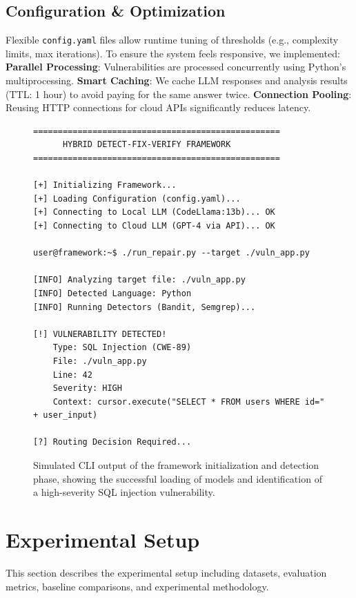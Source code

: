 \documentclass[conference]{IEEEtran}
\begin{document}
\subsection{Configuration \& Optimization}
Flexible \texttt{config.yaml} files allow runtime tuning of thresholds (e.g., complexity limits, max iterations). To ensure the system feels responsive, we implemented:
\textbf{Parallel Processing}: Vulnerabilities are processed concurrently using Python's multiprocessing.
\textbf{Smart Caching}: We cache LLM responses and analysis results (TTL: 1 hour) to avoid paying for the same answer twice.
\textbf{Connection Pooling}: Reusing HTTP connections for cloud APIs significantly reduces latency.
\begin{figure}[t]
\centering
\begin{small}
\begin{verbatim}
==================================================
      HYBRID DETECT-FIX-VERIFY FRAMEWORK
==================================================

[+] Initializing Framework...
[+] Loading Configuration (config.yaml)...
[+] Connecting to Local LLM (CodeLlama:13b)... OK
[+] Connecting to Cloud LLM (GPT-4 via API)... OK

user@framework:~$ ./run_repair.py --target ./vuln_app.py

[INFO] Analyzing target file: ./vuln_app.py
[INFO] Detected Language: Python
[INFO] Running Detectors (Bandit, Semgrep)...

[!] VULNERABILITY DETECTED!
    Type: SQL Injection (CWE-89)
    File: ./vuln_app.py
    Line: 42
    Severity: HIGH
    Context: cursor.execute("SELECT * FROM users WHERE id=" + user_input)

[?] Routing Decision Required...
\end{verbatim}
\end{small}
\caption{Simulated CLI output of the framework initialization and detection phase, showing the successful loading of models and identification of a high-severity SQL injection vulnerability.}
\label{fig:ui_screenshot}
\end{figure}

\section{Experimental Setup}

This section describes the experimental setup including datasets, evaluation metrics, baseline comparisons, and experimental methodology.
\end{document}
